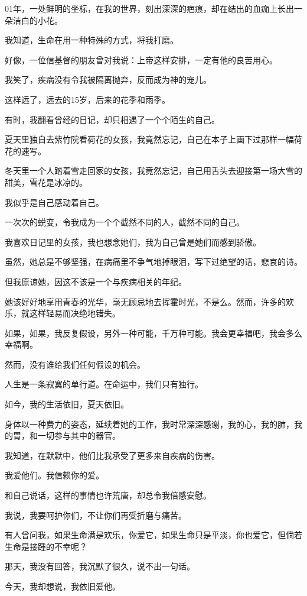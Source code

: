 \documentclass[12pt,a4paper]{article}
\begin{document}
		01年，一处鲜明的坐标，在我的世界，刻出深深的疤痕，却在结出的血痂上长出一朵洁白的小花。\par
		我知道，生命在用一种特殊的方式，将我打磨。\par
		好像，一位信基督的朋友曾对我说：上帝这样安排，一定有他的良苦用心。\par
		我笑了，疾病没有令我被隔离抛弃，反而成为神的宠儿。

		这样远了，远去的15岁，后来的花季和雨季。

		有时，我翻看曾经的日记，却只相遇了一个个陌生的自己。\par
		夏天里独自去紫竹院看荷花的女孩，我竟然忘记，自己在本子上画下过那样一幅荷花的速写。\par
		冬天里一个人踏着雪走回家的女孩，我竟然忘记，自己用舌头去迎接第一场大雪的甜美，雪花是冰凉的。

		我似乎是自己感动着自己。

		一次次的蜕变，令我成为一个个截然不同的人，截然不同的自己。\par
		我喜欢日记里的女孩，我也想念她们，我为自己曾是她们而感到骄傲。\par
		虽然，她总是不够坚强，在病痛里不争气地掉眼泪，写下过绝望的话，悲哀的诗。\par
		但我原谅她，因这不该是一个与疾病相关的年纪。\par
		她该好好地享用青春的光华，毫无顾忌地去挥霍时光，不是么。然而，许多的欢乐，就这样轻易而决绝地错失。

		如果，如果，我反复假设，另外一种可能，千万种可能。我会更幸福吧，我会多么幸福啊。\par
		然而，没有谁给我们任何假设的机会。

		人生是一条寂寞的单行道。在命运中，我们只有独行。

		如今，我的生活依旧，夏天依旧。

		身体以一种费力的姿态，延续着她的工作，我时常深深感谢，我的心，我的肺，我的胃，和一切参与其中的器官。\par
		我知道，在默默中，他们比我承受了更多来自疾病的伤害。\par
		我爱他们。我信赖你的爱。\par
		和自己说话，这样的事情也许荒唐，却总令我倍感安慰。\par
		我说，我要呵护你们，不让你们再受折磨与痛苦。

		有人曾问我，如果生命满是欢乐，你爱它，如果生命只是平淡，你也爱它，但倘若生命是接踵的不幸呢？\par
		那天，我没有回答，我沉默了很久，说不出一句话。\par
		今天，我却想说，我依旧爱他。
\end{document}
